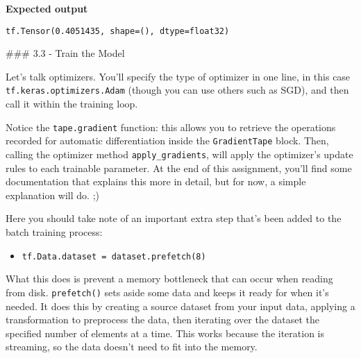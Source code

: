 \documentclass[11pt]{article}
\providecommand{\tightlist}{%
      \setlength{\itemsep}{0pt}\setlength{\parskip}{0pt}}
\begin{document}
    \textbf{Expected output}

\begin{verbatim}
tf.Tensor(0.4051435, shape=(), dtype=float32)
\end{verbatim}

    \#\#\# 3.3 - Train the Model

Let's talk optimizers. You'll specify the type of optimizer in one line,
in this case \texttt{tf.keras.optimizers.Adam} (though you can use
others such as SGD), and then call it within the training loop.

Notice the \texttt{tape.gradient} function: this allows you to retrieve
the operations recorded for automatic differentiation inside the
\texttt{GradientTape} block. Then, calling the optimizer method
\texttt{apply\_gradients}, will apply the optimizer's update rules to
each trainable parameter. At the end of this assignment, you'll find
some documentation that explains this more in detail, but for now, a
simple explanation will do. ;)

Here you should take note of an important extra step that's been added
to the batch training process:

\begin{itemize}
\tightlist
\item
  \texttt{tf.Data.dataset\ =\ dataset.prefetch(8)}
\end{itemize}

What this does is prevent a memory bottleneck that can occur when
reading from disk. \texttt{prefetch()} sets aside some data and keeps it
ready for when it's needed. It does this by creating a source dataset
from your input data, applying a transformation to preprocess the data,
then iterating over the dataset the specified number of elements at a
time. This works because the iteration is streaming, so the data doesn't
need to fit into the memory.
\end{document}
